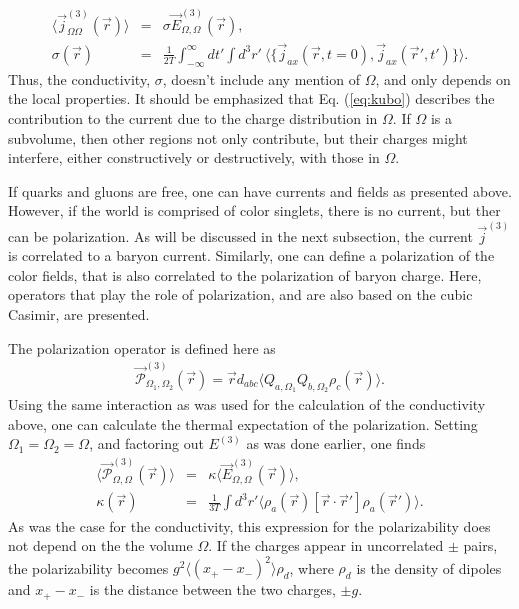 \documentclass[aps, prc, 12pt, nofootinbib, showpacs, superscriptaddress, tightenlines, groupedaddress]{revtex4-2}
\begin{document}
\begin{eqnarray}\label{eq:kubo}
\langle\vec{j}^{(3)}_{\Omega\Omega}(\vec{r})\rangle&=&\sigma \vec{E}^{(3)}_{\Omega,\Omega}(\vec{r}),\\
\nonumber
\sigma(\vec{r})&=&\frac{1}{2T}\int_{-\infty}^\infty dt'\int d^3r'~\langle\{\vec{j}_{ax}(\vec{r},t=0),\vec{j}_{ax}(\vec{r}',t')\}\rangle.
\end{eqnarray}
Thus, the conductivity, $\sigma$, doesn't include any mention of $\Omega$, and only depends on the local properties. It should be emphasized that Eq. (\ref{eq:kubo}) describes the contribution to the current due to the charge distribution in $\Omega$. If $\Omega$ is a subvolume, then other regions not only contribute, but their charges might interfere, either constructively or destructively, with those in $\Omega$.

If quarks and gluons are free, one can have currents and fields as presented above. However, if the world is comprised of color singlets, there is no current, but ther can be polarization. As will be discussed in the next subsection, the current $\vec{j}^{(3)}$ is correlated to a baryon current. Similarly, one can define a polarization of the color fields, that is also correlated to the polarization of baryon charge. Here, operators that play the role of polarization, and are also based on the cubic Casimir, are presented. 

The polarization operator is defined here as
\begin{eqnarray}
\vec{\mathcal{P}}_{\Omega_1,\Omega_2}^{(3)}(\vec{r})=\vec{r}d_{abc}\langle Q_{a,\Omega_1}Q_{b,\Omega_2}\rho_c(\vec{r})\rangle.
\end{eqnarray}
Using the same interaction as was used for the calculation of the conductivity above, one can calculate the thermal expectation of the polarization. Setting $\Omega_1=\Omega_2=\Omega$, and factoring out $E^{(3)}$ as was done earlier, one finds
\begin{eqnarray}\label{eq:polarization}
\langle\vec{\mathcal{P}}_{\Omega,\Omega}^{(3)}(\vec{r})\rangle&=&\kappa \langle\vec{E}^{(3)}_{\Omega,\Omega}(\vec{r})\rangle,\\
\nonumber
\kappa(\vec{r})&=&\frac{1}{3T}\int d^3r'\langle \rho_a(\vec{r})[\vec{r}\cdot\vec{r}']\rho_a(\vec{r}')\rangle.
\end{eqnarray}
As was the case for the conductivity, this expression for the polarizability does not depend on the the volume $\Omega$. If the charges appear in uncorrelated $\pm$ pairs, the polarizability becomes $g^2\langle(x_+-x_-)^2\rangle\rho_d$, where $\rho_d$ is the density of dipoles and $x_+-x_-$ is the distance between the two charges, $\pm g$. 
\end{document}
